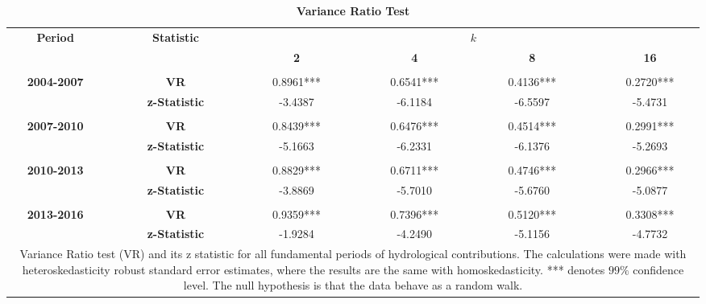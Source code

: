 \documentclass[12pt,halfline,a4paper]{ouparticle}
\begin{document}
\begin{table}[h]
	\centering
	\caption{\textbf{Variance Ratio Test}}
	\begin{tabular}{ccccccccccc}
		\toprule
		\toprule
		\multirow{2}[4]{*}{\textbf{Period}} &       & \multirow{2}[4]{*}{\textbf{Statistic}} &       & \multicolumn{7}{c}{$k$} \\
		\cmidrule{5-11}          &       &       &       & \textbf{2} &       & \textbf{4} &       & \textbf{8} &       & \textbf{16} \\
		\cmidrule{1-1}\cmidrule{3-3}\cmidrule{5-5}\cmidrule{7-7}\cmidrule{9-9}\cmidrule{11-11}          &       &       &       &       &       &       &       &       &       &  \\
		\multirow{2}[0]{*}{\textbf{2004-2007}} &       & \textbf{VR} &       & 0.8961*** &       & 0.6541*** &       & 0.4136*** &       & 0.2720*** \\
		&       & \textbf{z-Statistic} &       & -3.4387 &       & -6.1184 &       & -6.5597 &       & -5.4731 \\
		&       &       &       &       &       &       &       &       &       &  \\
		\multirow{2}[0]{*}{\textbf{2007-2010}} &       & \textbf{VR} &       & 0.8439*** &       & 0.6476*** &       & 0.4514*** &       & 0.2991*** \\
		&       & \textbf{z-Statistic} &       & -5.1663 &       & -6.2331 &       & -6.1376 &       & -5.2693 \\
		&       &       &       &       &       &       &       &       &       &  \\
		\multirow{2}[0]{*}{\textbf{2010-2013}} &       & \textbf{VR} &       & 0.8829*** &       & 0.6711*** &       & 0.4746*** &       & 0.2966*** \\
		&       & \textbf{z-Statistic} &       & -3.8869 &       & -5.7010 &       & -5.6760 &       & -5.0877 \\
		&       &       &       &       &       &       &       &       &       &  \\
		\multirow{2}[1]{*}{\textbf{2013-2016}} &       & \textbf{VR} &       & 0.9359*** &       & 0.7396*** &       & 0.5120*** &       & 0.3308*** \\
		&       & \textbf{z-Statistic} &       & -1.9284 &       & -4.2490 &       & -5.1156 &       & -4.7732 \\
		\bottomrule
		\bottomrule
		\multicolumn{11}{p{15.5cm}}{\footnotesize{Variance Ratio test (VR) and its z statistic for all fundamental periods of hydrological contributions. The calculations were made with heteroskedasticity robust standard error estimates, where the results are the same with homoskedasticity. *** denotes $99\%$ confidence level. The null hypothesis is that the data behave as a random walk.}}
	\end{tabular}
	\label{tab:meanrevertion}
\end{table}
\end{document}
